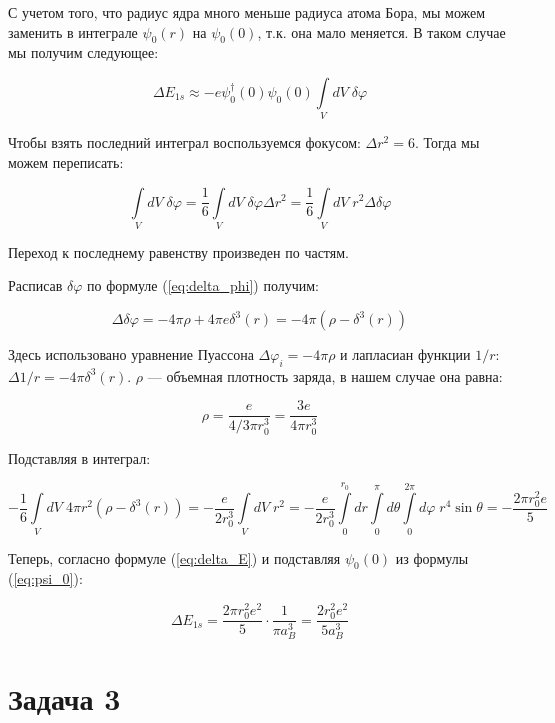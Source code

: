 \documentclass[a4paper, 12pt]{article}
\renewcommand{\phi}{\varphi} %
\begin{document}
С учетом того, что радиус ядра много меньше радиуса атома Бора, мы можем заменить в интеграле $\psi_0(r)$ на $\psi_0(0)$, т.к. она мало меняется. В таком случае мы получим следующее:

\begin{equation}
	\Delta E_{1s} \approx - e \psi_0^{\dagger}(0)\psi_0(0) \int \limits_V dV \; \delta \phi 
	\label{eq:delta_E}
\end{equation}

Чтобы взять последний интеграл воспользуемся фокусом: $\Delta r^2 = 6$. Тогда мы можем переписать:

\begin{equation*}
	\int\limits_V dV\; \delta \phi = \frac{1}{6} \int\limits_V dV \; \delta\phi \Delta r^2 = \frac{1}{6} \int\limits_V dV \; r^2 \Delta \delta\phi 
\end{equation*}

Переход к последнему равенству произведен по частям.

Расписав $\delta\phi$ по формуле (\ref{eq:delta_phi}) получим:

\begin{equation*}
	\Delta\delta \phi = -4\pi\rho + 4\pi e \delta^3(r) = -4\pi (\rho - \delta^3(r))
\end{equation*}

Здесь использовано уравнение Пуассона $\Delta \phi_i = -4\pi\rho$ и лапласиан функции $1/r$: \mbox{$\Delta 1/r = -4\pi\delta^3(r)$}. $\rho$ --- объемная плотность заряда, в нашем случае она равна:

\begin{equation*}
	\rho = \frac{e}{4/3 \pi r_0^3} = \frac{3e}{4\pi r_0^3}
\end{equation*}

Подставляя в интеграл:

\begin{equation*}
	-\frac{1}{6} \int\limits_V dV \; 4\pi r^2 (\rho - \delta^3(r)) = -\frac{e}{2r_0^3}\int\limits_V dV \; r^2 = -\frac{e}{2r_0^3} \int\limits_{0}^{r_0} dr \int\limits_{0}^{\pi} d\theta \int\limits_{0}^{2\pi} d\phi \; r^4 \sin\theta = - \frac{2\pi r_0^2 e}{5}
\end{equation*}

Теперь, согласно формуле (\ref{eq:delta_E}) и подставляя $\psi_0(0)$ из формулы (\ref{eq:psi_0}):

\begin{equation*}
	\Delta E_{1s} = \frac{2\pi r_0^2 e^2}{5} \cdot \frac{1}{\pi a_B^3} = \boxed{\frac{2r_0^2 e^2}{5 a_B^3}}
\end{equation*}

\section*{Задача 3}
	
\end{document}
